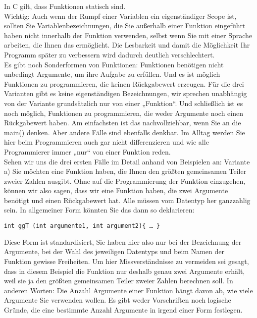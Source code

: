 In C gilt, dass Funktionen statisch sind.\\

Wichtig: Auch wenn der Rumpf einer Variablen ein eigenständiger Scope ist, sollten Sie Variablenbezeichnungen, die Sie außerhalb einer Funktion eingeführt haben nicht innerhalb der Funktion verwenden, selbst wenn Sie mit einer Sprache arbeiten, die Ihnen das ermöglicht. Die Lesbarkeit und damit die Möglichkeit Ihr Programm später zu verbessern wird dadurch deutlich verschlechtert.\\

Es gibt noch Sonderformen von Funktionen: Funktionen benötigen nicht unbedingt Argumente, um ihre Aufgabe zu erfüllen. Und es ist möglich Funktionen zu programmieren, die keinen Rückgabewert erzeugen. Für die drei Varianten gibt es keine eigenständigen Bezeichnungen, wir sprechen unabhängig von der Variante grundsätzlich nur von einer „Funktion“. Und schließlich ist es noch möglich, Funktionen zu programmieren, die weder Argumente noch einen Rückgabewert haben. Am einfachsten ist das nachvollziehbar, wenn Sie an die main() denken. Aber andere Fälle sind ebenfalls denkbar. Im Alltag werden Sie hier beim Programmieren auch gar nicht differenzieren und wie alle Programmierer immer „nur“ von einer Funktion reden.\\

Sehen wir uns die drei ersten Fälle im Detail anhand von Beispielen an:
Variante a) Sie möchten eine Funktion haben, die Ihnen den größten gemeinsamen Teiler zweier Zahlen ausgibt. Ohne auf die Programmierung der Funktion einzugehen, können wir also sagen, dass wir eine Funktion haben, die zwei Argumente benötigt und einen Rückgabewert hat. Alle müssen vom Datentyp her ganzzahlig sein. In allgemeiner Form könnten Sie das dann so deklarieren:

\begin{verbatim}
int ggT (int argumente1, int argument2){ … }
\end{verbatim}

Diese Form ist standardisiert, Sie haben hier also nur bei der Bezeichnung der Argumente, bei der Wahl des jeweiligen Datentyps und beim Namen der Funktion gewisse Freiheiten. Um hier Missverständnisse zu vermeiden sei gesagt, dass in diesem Beispiel die Funktion nur deshalb genau zwei Argumente erhält, weil sie ja den größten gemeinsamen Teiler zweier Zahlen berechnen soll. In anderen Worten: Die Anzahl Argumente einer Funktion hängt davon ab, wie viele Argumente Sie verwenden wollen. Es gibt weder Vorschriften noch logische Gründe, die eine bestimmte Anzahl Argumente in irgend einer Form festlegen.\\

